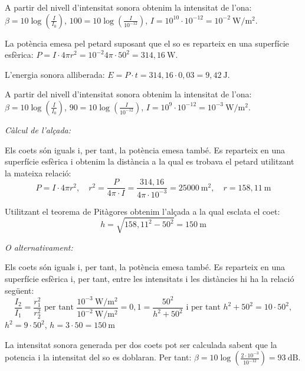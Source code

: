 \begin{solapartat}
 A partir del nivell d'intensitat sonora obtenim la intensitat de l'ona: $\beta = 10\log(\frac{I}{I_0})$, $100 = 10\log(\frac{I}{10^{-12}})$, $I = 10^{10}\cdot 10^{-12} = 10^{-2}\ \mathrm{W/m^2}$.

 La potència emesa pel petard suposant que el so es reparteix en una superfície esfèrica: $P = I\cdot 4\pi r^2 = 10^{-2}4\pi\cdot 50^2 = 314,16\ \mathrm{W}$.

 L'energia sonora alliberada: $E = P\cdot t = 314,16\cdot 0,03 = 9,42\ \mathrm{J}$.
\end{solapartat}

\begin{solapartat}
 A partir del nivell d'intensitat sonora obtenim la intensitat de l'ona: $\beta = 10\log(\frac{I}{I_0})$, $90 = 10\log(\frac{I}{10^{-12}})$, $I = 10^{9}\cdot 10^{-12} = 10^{-3}\ \mathrm{W/m^2}$.

\textit{Càlcul de l'alçada:}

 Els coets són iguals i, per tant, la potència emesa també. Es reparteix en una superfície esfèrica i obtenim la distància a la qual es trobava el petard utilitzant la mateixa relació:
\[ P = I\cdot 4\pi r^2,\quad r^2 = \frac{P}{4\pi\cdot I} = \frac{314,16}{4\pi\cdot 10^{-3}} = 25000\ \mathrm{m^2},\quad r = 158,11\ \mathrm{m} \]

 Utilitzant el teorema de Pitàgores obtenim l'alçada a la qual esclata el coet:
\[ h = \sqrt{158,11^2 - 50^2} = 150\ \mathrm{m} \]

\textit{O alternativament:}

 Els coets són iguals i, per tant, la potència emesa també. Es reparteix en una superfície esfèrica i, per tant, entre les intensitats i les distàncies hi ha la relació següent:
\[ \frac{I_2}{I_1} = \frac{r_1^2}{r_2^2} \text{ per tant } \frac{10^{-3}\ \mathrm{W/m^2}}{10^{-2}\ \mathrm{W/m^2}} = 0,1 = \frac{50^2}{h^2 + 50^2} \text{ i per tant } h^2 + 50^2 = 10\cdot 50^2, \]
$h^2 = 9\cdot 50^2$, $h = 3\cdot 50 = 150\ \mathrm{m}$

 La intensitat sonora generada per dos coets pot ser calculada sabent que la potencia i la intensitat del so es doblaran. Per tant: $\beta = 10\log\left(\frac{2\cdot 10^{-3}}{10^{-12}}\right) = 93\ \mathrm{dB}$.
\end{solapartat}
